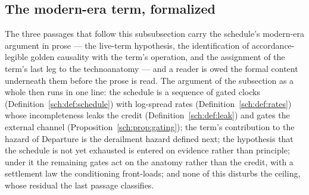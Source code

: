 \subsection{The modern-era term, formalized}\label{sch:subsub:modernterm}

The three passages that follow this subsubsection carry the
schedule's modern-era argument in prose --- the live-term
hypothesis, the identification of accordance-legible golden
causality with the term's operation, and the assignment of the
term's last leg to the technoanatomy --- and a reader is owed the
formal content underneath them before the prose is read. The
argument of the subsection as a whole then runs in one line: the
schedule is a sequence of gated clocks (Definition~\ref{sch:def:schedule})
with log-spread rates (Definition~\ref{sch:def:rates}) whose
incompleteness leaks the credit (Definition~\ref{sch:def:leak}) and
gates the external channel (Proposition~\ref{sch:prop:gating}); the
term's contribution to the hazard of Departure is the derailment
hazard defined next; the hypothesis that the schedule is not yet
exhausted is entered on evidence rather than principle; under it the
remaining gates act on the anatomy rather than the credit, with a
settlement law the conditioning front-loads; and none of this
disturbs the ceiling, whose residual the last passage classifies.

